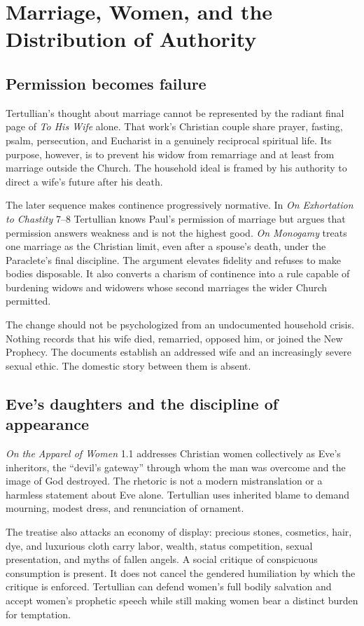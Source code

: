 \section{Marriage, Women, and the Distribution of Authority}

\subsection{Permission becomes failure}

Tertullian's thought about marriage cannot be represented by the radiant final
page of \emph{To His Wife} alone. That work's Christian couple share prayer,
fasting, psalm, persecution, and Eucharist in a genuinely reciprocal spiritual
life. Its purpose, however, is to prevent his widow from remarriage and at least
from marriage outside the Church. The household ideal is framed by his authority
to direct a wife's future after his death.

The later sequence makes continence progressively normative. In \emph{On
Exhortation to Chastity} 7--8 Tertullian knows Paul's permission of marriage but
argues that permission answers weakness and is not the highest good.
\emph{On Monogamy} treats one marriage as the Christian limit, even after a
spouse's death, under the Paraclete's final discipline. The argument elevates
fidelity and refuses to make bodies disposable. It also converts a charism of
continence into a rule capable of burdening widows and widowers whose second
marriages the wider Church permitted.

The change should not be psychologized from an undocumented household crisis.
Nothing records that his wife died, remarried, opposed him, or joined the New
Prophecy. The documents establish an addressed wife and an increasingly severe
sexual ethic. The domestic story between them is absent.

\subsection{Eve's daughters and the discipline of appearance}

\emph{On the Apparel of Women} 1.1 addresses Christian women collectively as
Eve's inheritors, the ``devil's gateway'' through whom the man was overcome and
the image of God destroyed. The rhetoric is not a modern mistranslation or a
harmless statement about Eve alone. Tertullian uses inherited blame to demand
mourning, modest dress, and renunciation of ornament.

The treatise also attacks an economy of display: precious stones, cosmetics,
hair, dye, and luxurious cloth carry labor, wealth, status competition, sexual
presentation, and myths of fallen angels. A social critique of conspicuous
consumption is present. It does not cancel the gendered humiliation by which
the critique is enforced. Tertullian can defend women's full bodily salvation
and accept women's prophetic speech while still making women bear a distinct
burden for temptation.

